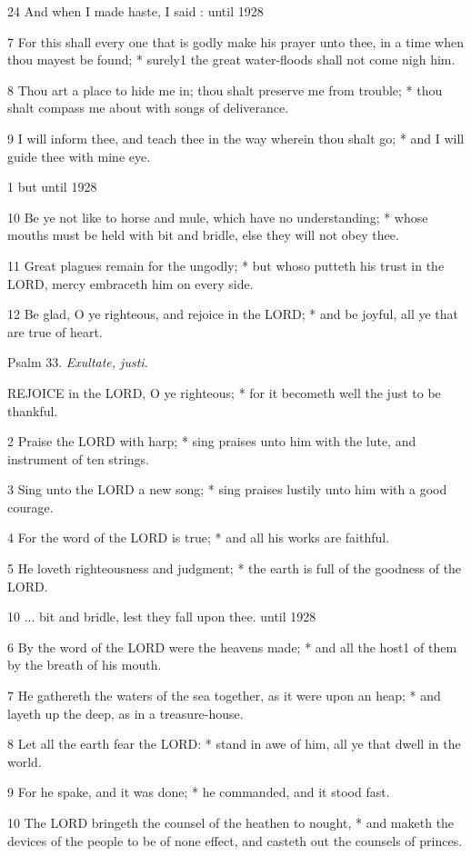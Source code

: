 24 And when I made haste,
I said : until
1928

7 For this shall every one that is godly make his prayer
unto thee, in a time when thou mayest be found; * surely1 the
great water-floods shall not come nigh him.

8 Thou art a place to hide me in; thou shalt preserve
me from trouble; * thou shalt compass me about with songs of deliverance.

9 I will inform thee, and teach thee in the way wherein
thou shalt go; * and I will guide thee with mine eye.

1 but until
1928

10 Be ye not like to horse and mule, which have no
understanding; * whose mouths must be held with bit and bridle, else they
will not obey thee.

11 Great plagues remain for the ungodly; * but whoso
putteth his trust in the LORD, mercy embraceth
him on every side.

12 Be glad, O ye righteous, and rejoice in the LORD;
* and be joyful, all ye that are true of heart.

Psalm
33. \emph{Exultate, justi.}

REJOICE
in the LORD, O ye righteous; * for it becometh
well the just to be thankful.

2 Praise the LORD with harp;
* sing praises unto him with the lute, and instrument of ten strings.

3 Sing unto the LORD a new song;
* sing praises lustily unto him with a good courage.

4 For the word of the LORD is
true; * and all his works are faithful.

5 He loveth righteousness and judgment; * the earth
is full of the goodness of the LORD.

10 ... bit and bridle, lest they fall upon thee. until
1928

6 By the word of the LORD were
the heavens made; * and all the host1 of them by the breath of
his mouth.

7 He gathereth the waters of the sea together, as it
were upon an heap; * and layeth up the deep, as in a treasure-house.

8 Let all the earth fear the LORD:
* stand in awe of him, all ye that dwell in the world.

9 For he spake, and it was done; * he commanded, and
it stood fast.

10 The LORD bringeth the counsel
of the heathen to nought, * and maketh the devices of the people to be of
none effect, and casteth out the counsels of princes.

